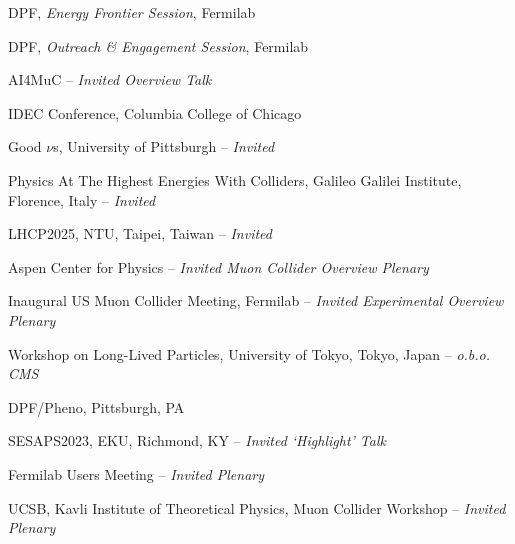\documentclass[11pt,letterpaper]{article}
\begin{document}
  \begin{itemizetighter}

  \item DPF, \textit{Energy Frontier Session}, Fermilab  %
  \item DPF, \textit{Outreach \& Engagement Session}, Fermilab  %

  \item AI4MuC -- \emph{Invited Overview Talk}  %


  \item IDEC Conference, Columbia College of Chicago   %

  \item Good $\nu$s, University of Pittsburgh -- \emph{Invited}   %

  \item Physics At The Highest Energies With Colliders, Galileo Galilei Institute, Florence, Italy -- \emph{Invited}   %


  \item LHCP2025, NTU, Taipei, Taiwan -- \emph{Invited}   %


  \item Aspen Center for Physics -- \emph{Invited Muon Collider Overview Plenary}   %

  \item Inaugural US Muon Collider Meeting, Fermilab -- \emph{Invited Experimental Overview Plenary}   %

  \item Workshop on Long-Lived Particles, University of Tokyo, Tokyo, Japan -- \emph{o.b.o. CMS}   %

  \item DPF/Pheno, Pittsburgh, PA  %

  \item SESAPS2023, EKU, Richmond, KY -- \emph{Invited `Highlight' Talk} %

  \item Fermilab Users Meeting -- \emph{Invited Plenary} 

  \item UCSB, Kavli Institute of Theoretical Physics, Muon Collider Workshop -- \emph{Invited Plenary} 


\end{itemizetighter}
\end{document}
